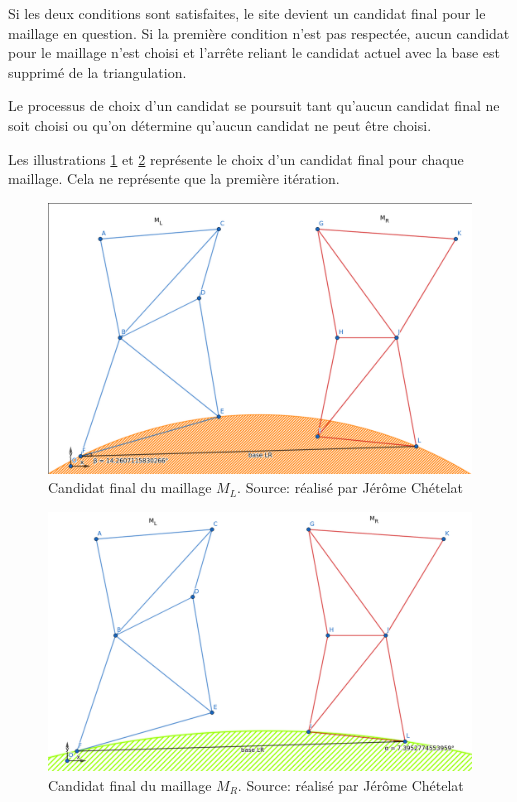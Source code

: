Si les deux conditions sont satisfaites, le site devient un candidat final pour le maillage en question.
Si la première condition n'est pas respectée, aucun candidat pour le maillage n'est choisi et l'arrête reliant le candidat actuel avec la base est supprimé de la triangulation.

Le processus de choix d'un candidat se poursuit tant qu'aucun candidat final ne soit choisi ou qu'on détermine qu'aucun candidat ne peut être choisi.

Les illustrations \ref{fig:site_ML_candidate} et \ref{fig:site_MR_candidate} représente le choix d'un candidat final pour chaque maillage. Cela ne représente que la première itération.
\begin{figure}[htbp!]
    \centering
    \includegraphics[width=0.8\linewidth]{figures/site_ML.png}
    \caption{Candidat final du maillage $M_L$. Source: réalisé par Jérôme Chételat}
    \label{fig:site_ML_candidate}
\end{figure}

\begin{figure}[htpb!]
    \centering
    \includegraphics[width=0.8\linewidth]{figures/site_MR.png}
    \caption{Candidat final du maillage $M_R$. Source: réalisé par Jérôme Chételat}
    \label{fig:site_MR_candidate}
\end{figure}

